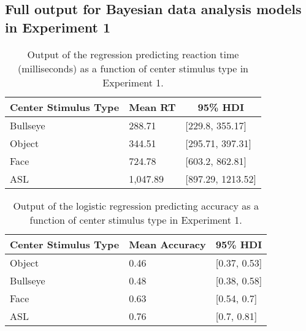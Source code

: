 \documentclass[,man,floatsintext]{apa6}
\begin{document}
\begin{appendix}
\hypertarget{full-output-for-bayesian-data-analysis-models-in-experiment-1}{%
\section{Full output for Bayesian data analysis models in Experiment
1}\label{full-output-for-bayesian-data-analysis-models-in-experiment-1}}

\begin{table}[h]
\begin{center}
\begin{threeparttable}
\caption{\label{tab:trio-rt-model}Output of the regression predicting reaction time (milliseconds) as a function of center stimulus type in Experiment 1.}
\begin{tabular}{lll}
\toprule
Center Stimulus Type & \multicolumn{1}{c}{Mean RT} & \multicolumn{1}{c}{95\% HDI}\\
\midrule
Bullseye & 288.71 & [229.8, 355.17]\\
Object & 344.51 & [295.71, 397.31]\\
Face & 724.78 & [603.2, 862.81]\\
ASL & 1,047.89 & [897.29, 1213.52]\\
\bottomrule
\end{tabular}
\end{threeparttable}
\end{center}
\end{table}

\begin{table}[h]
\begin{center}
\begin{threeparttable}
\caption{\label{tab:trio-acc-model}Output of the logistic regression predicting accuracy as a function of center stimulus type in Experiment 1.}
\begin{tabular}{lll}
\toprule
Center Stimulus Type & \multicolumn{1}{c}{Mean Accuracy} & \multicolumn{1}{c}{95\% HDI}\\
\midrule
Object & 0.46 & [0.37, 0.53]\\
Bullseye & 0.48 & [0.38, 0.58]\\
Face & 0.63 & [0.54, 0.7]\\
ASL & 0.76 & [0.7, 0.81]\\
\bottomrule
\end{tabular}
\end{threeparttable}
\end{center}
\end{table}


\end{appendix}
\end{document}
